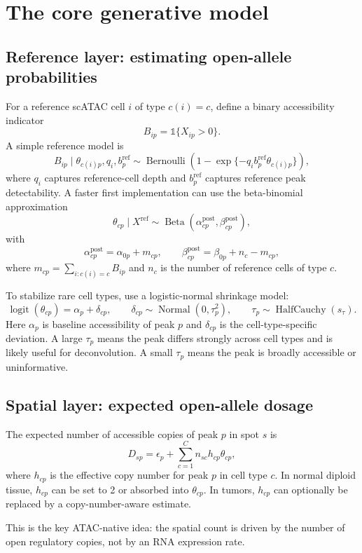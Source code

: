 \documentclass[11pt]{article}
\newcommand{\Bern}{\operatorname{Bernoulli}}
\newcommand{\Normal}{\operatorname{Normal}}
\newcommand{\logit}{\operatorname{logit}}
\begin{document}
\section{The core generative model}

\subsection{Reference layer: estimating open-allele probabilities}

For a reference scATAC cell $i$ of type $c(i)=c$, define a binary accessibility indicator
\[
B_{ip} = \mathbb{1}\{X_{ip}>0\}.
\]
A simple reference model is
\[
B_{ip} \mid \theta_{c(i)p}, q_i, b^{\mathrm{ref}}_p
\sim
\Bern\left(1-\exp\{-q_i b^{\mathrm{ref}}_p \theta_{c(i)p}\}\right),
\]
where $q_i$ captures reference-cell depth and $b^{\mathrm{ref}}_p$ captures reference peak detectability. A faster first implementation can use the beta-binomial approximation
\[
\theta_{cp} \mid X^{\mathrm{ref}} \sim \operatorname{Beta}(\alpha_{cp}^{\mathrm{post}},\beta_{cp}^{\mathrm{post}}),
\]
with
\[
\alpha_{cp}^{\mathrm{post}} = \alpha_{0p}+m_{cp},
\qquad
\beta_{cp}^{\mathrm{post}} = \beta_{0p}+n_c-m_{cp},
\]
where $m_{cp}=\sum_{i:c(i)=c} B_{ip}$ and $n_c$ is the number of reference cells of type $c$.

To stabilize rare cell types, use a logistic-normal shrinkage model:
\[
\logit(\theta_{cp}) = \alpha_p + \delta_{cp},
\qquad
\delta_{cp}\sim \Normal(0,\tau_p^2),
\qquad
\tau_p\sim \operatorname{HalfCauchy}(s_\tau).
\]
Here $\alpha_p$ is baseline accessibility of peak $p$ and $\delta_{cp}$ is the cell-type-specific deviation. A large $\tau_p$ means the peak differs strongly across cell types and is likely useful for deconvolution. A small $\tau_p$ means the peak is broadly accessible or uninformative.

\subsection{Spatial layer: expected open-allele dosage}

The expected number of accessible copies of peak $p$ in spot $s$ is
\[
D_{sp}=\epsilon_p + \sum_{c=1}^{C} n_{sc} h_{cp}\theta_{cp},
\]
where $h_{cp}$ is the effective copy number for peak $p$ in cell type $c$. In normal diploid tissue, $h_{cp}$ can be set to 2 or absorbed into $\theta_{cp}$. In tumors, $h_{cp}$ can optionally be replaced by a copy-number-aware estimate.

This is the key ATAC-native idea: the spatial count is driven by the number of open regulatory copies, not by an RNA expression rate.
\end{document}
